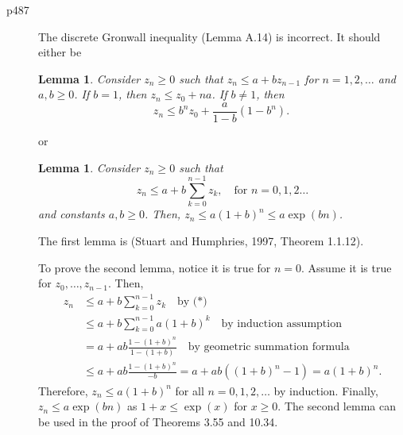 \documentclass[final]{article}
\newtheorem{lemma}[theorem]{Lemma}
\theoremstyle{definition}
\begin{document}
 \begin{description}
 
     \item[p487] 
 The discrete Gronwall inequality (Lemma A.14) is incorrect. It should either be
\begin{lemma} Consider $z_n\ge 0$  such that $z_n\le a+bz_{n-1}$ for $n=1,2,\dots$  and $a,b\ge 0$. If $b=1$, then $z_n\le z_0+na$. If $b\ne 1$, then
\[
z_n\le b^n z_0+ \frac{a}{1-b}(1-b^n).\
\]
\end{lemma}
or
\begin{lemma} Consider $z_n\ge 0$ such that 
\[
z_n\le a+b\sum_{k=0}^{n-1} z_k,\quad\text{for $n=0,1,2\dots$}\tag{*}
\]
and constants $a,b\ge0$. Then, $z_n\le a(1+b)^n\le a\exp(bn)$.
\end{lemma}
The first lemma is (Stuart and Humphries, 1997, Theorem 1.1.12).

To prove the second lemma, notice it is true for $n = 0$. Assume it is true for $z_0,\dots,z_{n-1}$. Then,
\begin{align*}
z_n& \le a+b\sum_{k=0}^{n-1} z_k \quad\text{by (*)}\\
&\le a+b \sum_{k=0}^{n-1}a(1+b)^k \quad\text{by induction assumption}\\
&= a+ab\frac{1-(1+b)^n}{1-(1+b)} \quad\text{by geometric summation formula}\\
&\le a+ab\frac{1-(1+b)^n}{-b}=a+ab((1+b)^n-1)=a(1+b)^n.
\end{align*}
Therefore, $z_n \le a(1 + b)^n$ 
for all $n = 0,1,2,\dots$ by induction. Finally, $z_n \le a \exp(bn)$ as $1 + x \le \exp(x)$ for
$x \ge 0$. The second lemma can be used in the proof of Theorems 3.55 and 10.34.
 \end{description}
\end{document}
